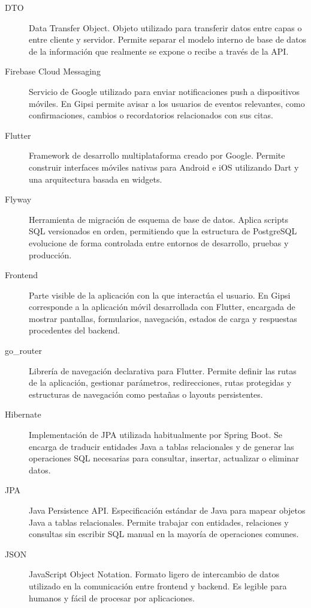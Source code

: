 \documentclass[12pt,a4paper,twoside]{report}
\begin{document}
\begin{description}
  \item[DTO]
  Data Transfer Object. Objeto utilizado para transferir datos entre capas o entre cliente
  y servidor. Permite separar el modelo interno de base de datos de la información que
  realmente se expone o recibe a través de la API.

  \item[Firebase Cloud Messaging]
  Servicio de Google utilizado para enviar notificaciones push a dispositivos móviles.
  En Gipsi permite avisar a los usuarios de eventos relevantes, como confirmaciones,
  cambios o recordatorios relacionados con sus citas.

  \item[Flutter]
  Framework de desarrollo multiplataforma creado por Google. Permite construir interfaces
  móviles nativas para Android e iOS utilizando Dart y una arquitectura basada en widgets.

  \item[Flyway]
  Herramienta de migración de esquema de base de datos. Aplica scripts SQL versionados
  en orden, permitiendo que la estructura de PostgreSQL evolucione de forma controlada
  entre entornos de desarrollo, pruebas y producción.

  \item[Frontend]
  Parte visible de la aplicación con la que interactúa el usuario. En Gipsi corresponde a
  la aplicación móvil desarrollada con Flutter, encargada de mostrar pantallas, formularios,
  navegación, estados de carga y respuestas procedentes del backend.

  \item[go\_router]
  Librería de navegación declarativa para Flutter. Permite definir las rutas de la
  aplicación, gestionar parámetros, redirecciones, rutas protegidas y estructuras de
  navegación como pestañas o layouts persistentes.

  \item[Hibernate]
  Implementación de JPA utilizada habitualmente por Spring Boot. Se encarga de traducir
  entidades Java a tablas relacionales y de generar las operaciones SQL necesarias para
  consultar, insertar, actualizar o eliminar datos.

  \item[JPA]
  Java Persistence API. Especificación estándar de Java para mapear objetos Java a tablas
  relacionales. Permite trabajar con entidades, relaciones y consultas sin escribir SQL
  manual en la mayoría de operaciones comunes.

  \item[JSON]
  JavaScript Object Notation. Formato ligero de intercambio de datos utilizado en la
  comunicación entre frontend y backend. Es legible para humanos y fácil de procesar
  por aplicaciones.


\end{description}
\end{document}
